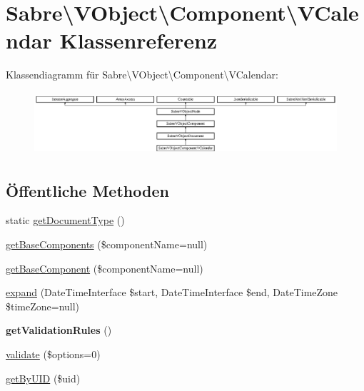 \hypertarget{class_sabre_1_1_v_object_1_1_component_1_1_v_calendar}{}\section{Sabre\textbackslash{}V\+Object\textbackslash{}Component\textbackslash{}V\+Calendar Klassenreferenz}
\label{class_sabre_1_1_v_object_1_1_component_1_1_v_calendar}
Klassendiagramm für Sabre\textbackslash{}V\+Object\textbackslash{}Component\textbackslash{}V\+Calendar\+:\begin{figure}[H]
\begin{center}
\leavevmode
\includegraphics[height=2.372881cm]{class_sabre_1_1_v_object_1_1_component_1_1_v_calendar}
\end{center}
\end{figure}
\subsection*{Öffentliche Methoden}
\begin{DoxyCompactItemize}
\item 
static \mbox{\hyperlink{class_sabre_1_1_v_object_1_1_component_1_1_v_calendar_a26c70b7253373bedcc64c9886df4aafd}{get\+Document\+Type}} ()
\item 
\mbox{\hyperlink{class_sabre_1_1_v_object_1_1_component_1_1_v_calendar_aa097c5e50f722fff232ed43160e48176}{get\+Base\+Components}} (\$component\+Name=null)
\item 
\mbox{\hyperlink{class_sabre_1_1_v_object_1_1_component_1_1_v_calendar_acac200821a9ed220efc0430603355658}{get\+Base\+Component}} (\$component\+Name=null)
\item 
\mbox{\hyperlink{class_sabre_1_1_v_object_1_1_component_1_1_v_calendar_afccb1c7c88dca0ddb71d51a89fda9044}{expand}} (Date\+Time\+Interface \$start, Date\+Time\+Interface \$end, Date\+Time\+Zone \$time\+Zone=null)
\item 
\mbox{\label{class_sabre_1_1_v_object_1_1_component_1_1_v_calendar_a7ec547076fd81a25c4a9f726477716fd}} 
{\bfseries get\+Validation\+Rules} ()
\item 
\mbox{\hyperlink{class_sabre_1_1_v_object_1_1_component_1_1_v_calendar_ab07a00ff63edb5b74b06f3876f4371da}{validate}} (\$options=0)
\item 
\mbox{\hyperlink{class_sabre_1_1_v_object_1_1_component_1_1_v_calendar_a694f8253fe4066b08c02b594ce7901c7}{get\+By\+U\+ID}} (\$uid)
\end{DoxyCompactItemize}
